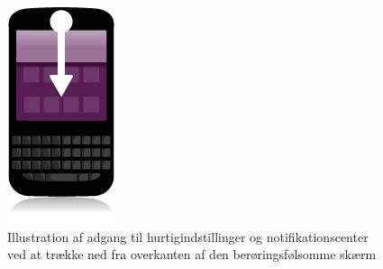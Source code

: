 \begin{figure}
	\centering
	\includegraphics[width=\linewidth]{images/illustrations/navigation_dragdown}	
	\caption{Illustration af adgang til hurtigindstillinger og notifikationscenter ved at trække ned fra overkanten af den berøringsfølsomme skærm}
	\label{fig:notifications}
\end{figure}

